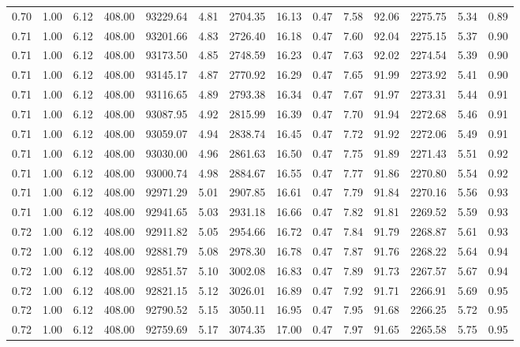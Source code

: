 \begin{table}[!ht]
\begin{tabular}{rrrrrrrrrrrrrr}
0.70 & 1.00 & 6.12 & 408.00 & 93229.64 & 4.81 & 2704.35 & 16.13 & 0.47 & 7.58 & 92.06 & 2275.75 & 5.34 & 0.89 \\
0.71 & 1.00 & 6.12 & 408.00 & 93201.66 & 4.83 & 2726.40 & 16.18 & 0.47 & 7.60 & 92.04 & 2275.15 & 5.37 & 0.90 \\
0.71 & 1.00 & 6.12 & 408.00 & 93173.50 & 4.85 & 2748.59 & 16.23 & 0.47 & 7.63 & 92.02 & 2274.54 & 5.39 & 0.90 \\
0.71 & 1.00 & 6.12 & 408.00 & 93145.17 & 4.87 & 2770.92 & 16.29 & 0.47 & 7.65 & 91.99 & 2273.92 & 5.41 & 0.90 \\
0.71 & 1.00 & 6.12 & 408.00 & 93116.65 & 4.89 & 2793.38 & 16.34 & 0.47 & 7.67 & 91.97 & 2273.31 & 5.44 & 0.91 \\
0.71 & 1.00 & 6.12 & 408.00 & 93087.95 & 4.92 & 2815.99 & 16.39 & 0.47 & 7.70 & 91.94 & 2272.68 & 5.46 & 0.91 \\
0.71 & 1.00 & 6.12 & 408.00 & 93059.07 & 4.94 & 2838.74 & 16.45 & 0.47 & 7.72 & 91.92 & 2272.06 & 5.49 & 0.91 \\
0.71 & 1.00 & 6.12 & 408.00 & 93030.00 & 4.96 & 2861.63 & 16.50 & 0.47 & 7.75 & 91.89 & 2271.43 & 5.51 & 0.92 \\
0.71 & 1.00 & 6.12 & 408.00 & 93000.74 & 4.98 & 2884.67 & 16.55 & 0.47 & 7.77 & 91.86 & 2270.80 & 5.54 & 0.92 \\
0.71 & 1.00 & 6.12 & 408.00 & 92971.29 & 5.01 & 2907.85 & 16.61 & 0.47 & 7.79 & 91.84 & 2270.16 & 5.56 & 0.93 \\
0.71 & 1.00 & 6.12 & 408.00 & 92941.65 & 5.03 & 2931.18 & 16.66 & 0.47 & 7.82 & 91.81 & 2269.52 & 5.59 & 0.93 \\
0.72 & 1.00 & 6.12 & 408.00 & 92911.82 & 5.05 & 2954.66 & 16.72 & 0.47 & 7.84 & 91.79 & 2268.87 & 5.61 & 0.93 \\
0.72 & 1.00 & 6.12 & 408.00 & 92881.79 & 5.08 & 2978.30 & 16.78 & 0.47 & 7.87 & 91.76 & 2268.22 & 5.64 & 0.94 \\
0.72 & 1.00 & 6.12 & 408.00 & 92851.57 & 5.10 & 3002.08 & 16.83 & 0.47 & 7.89 & 91.73 & 2267.57 & 5.67 & 0.94 \\
0.72 & 1.00 & 6.12 & 408.00 & 92821.15 & 5.12 & 3026.01 & 16.89 & 0.47 & 7.92 & 91.71 & 2266.91 & 5.69 & 0.95 \\
0.72 & 1.00 & 6.12 & 408.00 & 92790.52 & 5.15 & 3050.11 & 16.95 & 0.47 & 7.95 & 91.68 & 2266.25 & 5.72 & 0.95 \\
0.72 & 1.00 & 6.12 & 408.00 & 92759.69 & 5.17 & 3074.35 & 17.00 & 0.47 & 7.97 & 91.65 & 2265.58 & 5.75 & 0.95 \\

\end{tabular}
\end{table}
